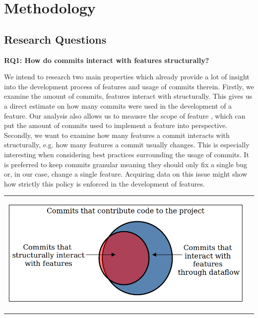 \section*{Methodology}\label{ch:methodology}

\subsection*{Research Questions}\label{sec:research_questions}

\textbf{RQ1: How do commits interact with features structurally?}

We intend to research two main properties which already provide a lot of insight into the development process of features and usage of commits therein.
Firstly, we examine the amount of commits, features interact with structurally.
This gives us a direct estimate on how many commits were used in the development of a feature.
Our analysis also allows us to meausre the scope of feature
, which can put the amount of commits used to implement a feature into perspective.
Secondly, we want to examine how many features a commit interacts with structurally, e.g. how many features a commit usually changes. 
This is especially interesting when considering best practices surrounding the usage of commits.
It is preferred to keep commits granular meaning they should only fix a single bug or, in our case, change a single feature.
Acquiring data on this issue might show how strictly this policy is enforced in the development of features. \\

\begin{center}
\begin{tabular}{cc}
\includegraphics[height=6cm]{gfx/Commits-of-a-Software-Project.png}
\end{tabular}
\end{center}

